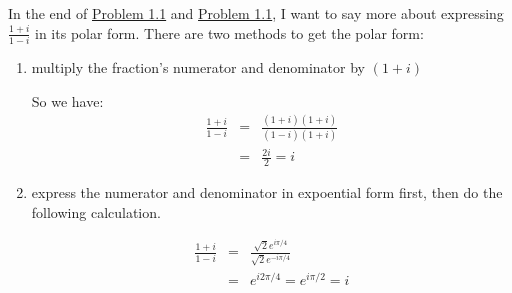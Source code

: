 \documentclass[koma,a4paper,utopia,12pt,listings-color,microtype,paralist,colorlinks,urlcolor=red]{org-article}
\begin{document}
In the end of \hyperref[prob11]{Problem 1.1} and \hyperref[prob11]{Problem 1.1}, I want to say
more about expressing \(\tfrac{1+i}{1-i}\) in its polar form. There are two
methods to get the polar form:
\begin{enumerate}
\item multiply the fraction's numerator and denominator by \(( 1 + i )\)

So we have:
\begin{eqnarray*}
\frac{1+i}{1-i}& = & \frac{(1+i)(1+i)}{(1-i)(1+i)} \\
&=& \frac{2i}{2} = i
\end{eqnarray*}

\item express the numerator and denominator in expoential form first, then do the
following calculation.

\begin{eqnarray*}
\frac{1+i}{1-i} &=& \frac{\sqrt{2}e^{i\pi/4}}{\sqrt{2}e^{-i\pi/4}}  \\
&=& e^{i2\pi/4} = e^{i\pi/2} = i
\end{eqnarray*}
\end{enumerate}
\end{document}
